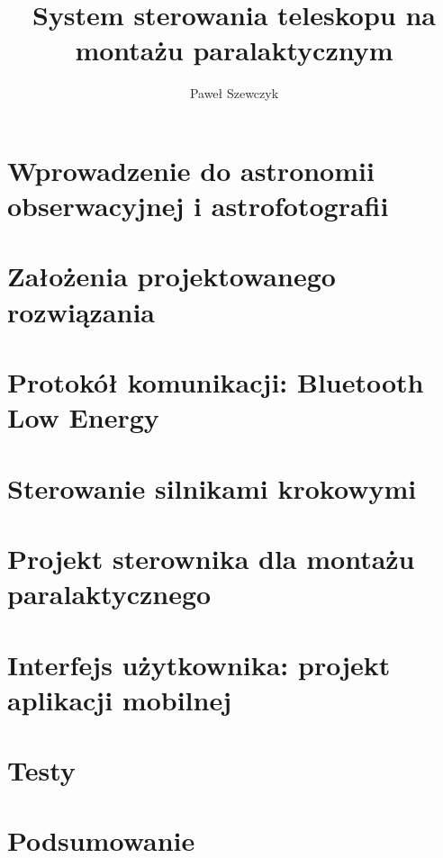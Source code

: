 \documentclass[a4paper,11pt,twoside,openany]{book}
\title{System sterowania teleskopu na montażu paralaktycznym}
\author{Paweł Szewczyk}
\date{}
\begin{document}
\maketitle

\tableofcontents

\chapter{Wprowadzenie do astronomii obserwacyjnej i astrofotografii}


\chapter{Założenia projektowanego rozwiązania}


\chapter{Protokół komunikacji: Bluetooth Low Energy}


\chapter{Sterowanie silnikami krokowymi}


\chapter{Projekt sterownika dla montażu paralaktycznego}


\chapter{Interfejs użytkownika: projekt aplikacji mobilnej}

\chapter{Testy}

\chapter{Podsumowanie}


\end{document}

